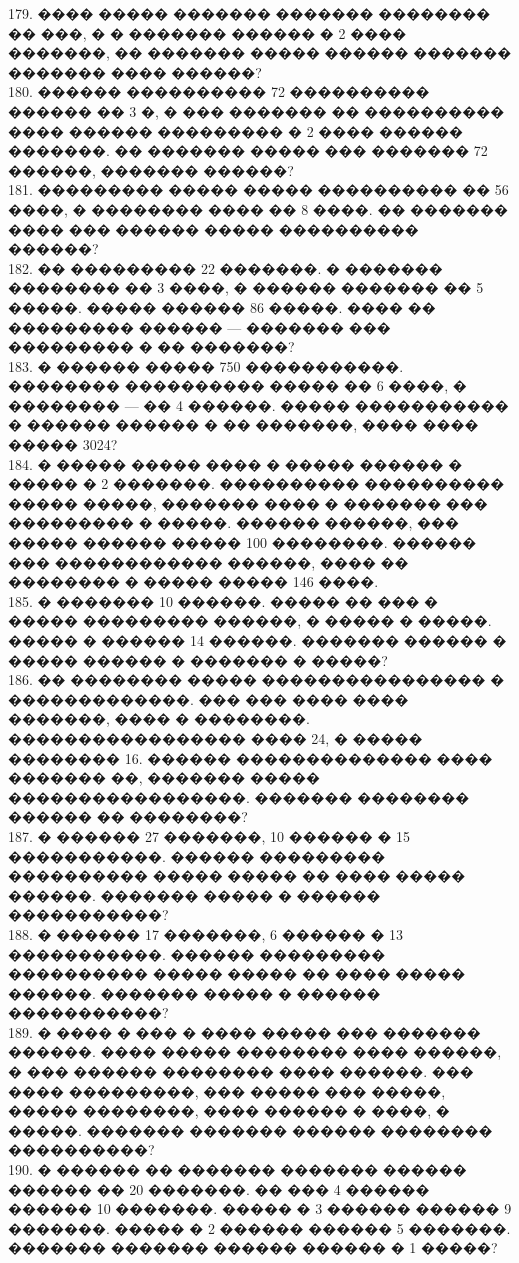 \documentclass[12pt]{article}
\begin{document}
179. ����  ����� ������� ������� �������� �� ���, � � ������� ������ � 2 ���� �������, �� ������� ����� ������ ������� ������� ���� ������?\\
180. ������ ���������� 72 ���������� ������ �� 3 �, � ��� ������� �� ���������� ���� ������ ��������� � 2 ���� ������ �������. �� ������� ����� ��� ������� 72 ������, ������� ������?\\
181. ��������� ����� ����� ���������� �� 56 ����, � �������� ���� �� 8 ����. �� ������� ���� ��� ������ ����� ���������� ������?\\
182. �� ��������� 22 �������. � ������� �������� �� 3 ����, � ������ ������� �� 5 �����. ����� ������ 86 �����. ���� �� ��������� ������ --- ������� ��� ��������� � �� �������?\\
183. � ������ ����� 750 �����������. �������� ���������� ����� �� 6 ����, � �������� --- �� 4 ������. ����� ����������� � ������ ������ � �� �������, ���� ���� ����� 3024?\\
184. � ����� ����� ���� � ����� ������ � ����� � 2 �������. ���������� ���������� ����� �����, ������� ���� � ������� ��� ��������� � �����. ������ ������, ��� ����� ������ ����� 100 ��������. ������ ��� ������������ ������, ���� �� �������� � ����� ����� 146 ����.\\
185. � ������� 10 ������. ����� �� ��� � ����� ��������� ������, � ����� � �����. ����� � ������ 14 ������. ������� ������ � ����� ������ � ������� � �����?\\
186. �� �������� ����� ���������������� � �������������. ��� ��� ���� ���� �������, ���� � ��������. ����������������� ���� 24, � ����� �������� 16. ������ �������������� ���� ������� ��, ������� ����� �����������������. ������� ��������  ������ �� ��������?\\
187. � ������ 27 �������, 10 ������ � 15 �����������. ������ ��������� ���������� ����� ����� �� ���� ����� ������. ������� ����� � ������ �����������?\\
188. � ������ 17 �������, 6 ������ � 13 �����������. ������ ��������� ���������� ����� ����� �� ���� ����� ������. ������� ����� � ������ �����������?\\
189. � ���� � ��� � ���� ����� ��� ������� ������. ���� ����� �������� ���� ������, � ��� ������ �������� ���� ������. ��� ���� ���������, ��� ����� ��� �����, ����� ��������, ���� ������ � ����, � �����. ������� ������� ������ �������� ����������?\\
190. � ������ �� ������� ������� ������ ������ �� 20 �������. �� ��� 4 ������ ������ 10 �������. ����� � 3 ������ ������ 9 �������. ����� � 2 ������ ������ 5 �������. ������� ������� ������ ������ � 1 �����?\\
\end{document}
